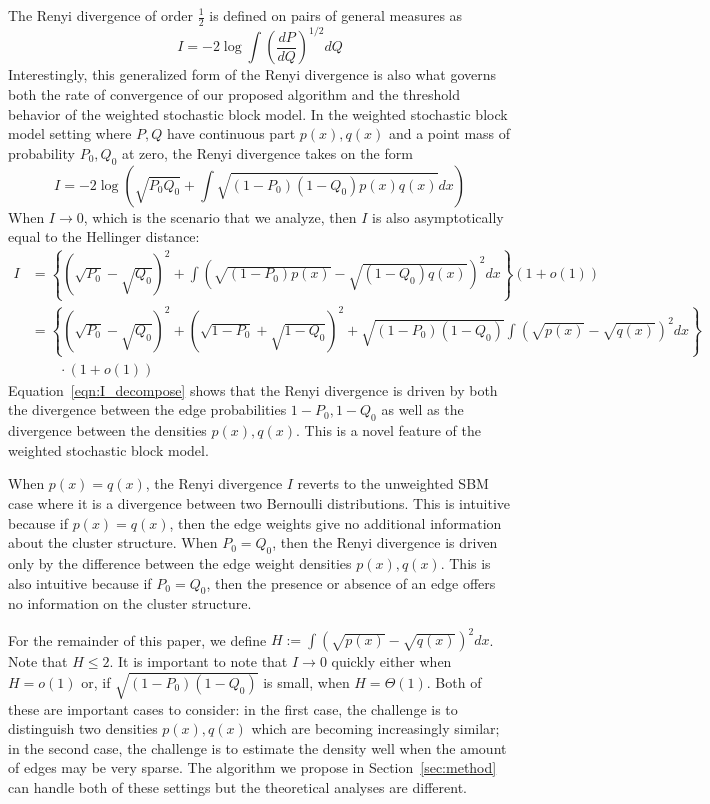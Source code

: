 \documentclass{article}
\begin{document}
The Renyi divergence of order $\frac{1}{2}$ is defined on pairs of general measures as 
\[
I = -2 \log \int \left( \frac{dP}{dQ} \right)^{1/2} dQ
\]
Interestingly, this generalized form of the Renyi divergence is also what governs both the rate of convergence of our proposed algorithm and the threshold behavior of the weighted stochastic block model. In the weighted stochastic block model setting where $P, Q$ have continuous part $p(x), q(x)$ and a point mass of probability $P_0, Q_0$ at zero, the Renyi divergence takes on the form
\[
I = -2 \log \left( \sqrt{P_0 Q_0} + \int \sqrt{(1-P_0)(1-Q_0)p(x) q(x)} dx \right)
\]
When $I \rightarrow 0$, which is the scenario that we analyze, then $I$ is also asymptotically equal to the Hellinger distance:
\begin{align}
I &= \left\{ (\sqrt{P_0} - \sqrt{Q_0})^2 + \int (\sqrt{(1-P_0)p(x)} - \sqrt{(1-Q_0)q(x)} )^2 dx \right\} (1 + o(1)) \nonumber \\ 
 &= \left\{ (\sqrt{P_0} - \sqrt{Q_0})^2 + (\sqrt{1-P_0} + \sqrt{1-Q_0})^2 + 
             \sqrt{(1-P_0)(1-Q_0)} \int (\sqrt{p(x)} - \sqrt{q(x)} )^2 dx \right\} \nonumber \\
             & \qquad \cdot (1 + o(1)) \label{eqn:I_decompose} 
\end{align}
Equation~\ref{eqn:I_decompose} shows that the Renyi divergence is driven by both the divergence between the edge probabilities $1-P_0, 1-Q_0$ as well as the divergence between the densities $p(x), q(x)$. This is a novel feature of the weighted stochastic block model. 


When $p(x) = q(x)$, the Renyi divergence $I$ reverts to the unweighted SBM case where it is a divergence between two Bernoulli distributions. This is intuitive because if $p(x) = q(x)$, then the edge weights give no additional information about the cluster structure. When $P_0 = Q_0$, then the Renyi divergence is driven only by the difference between the edge weight densities $p(x), q(x)$. This is also intuitive because if $P_0 = Q_0$, then the presence or absence of an edge offers no information on the cluster structure. 


For the remainder of this paper, we define $H := \int (\sqrt{p(x)} - \sqrt{q(x)})^2 dx$. Note that $H \leq 2$. It is important to note that $I \rightarrow 0$ quickly either when $H = o(1)$ or, if $\sqrt{(1-P_0)(1-Q_0)}$ is small, when $H = \Theta(1)$. Both of these are important cases to consider: in the first case, the challenge is to distinguish two densities $p(x), q(x)$ which are becoming increasingly similar; in the second case, the challenge is to estimate the density well when the amount of edges may be very sparse. The algorithm we propose in Section~\ref{sec:method} can handle both of these settings but the theoretical analyses are different. 
\end{document}
